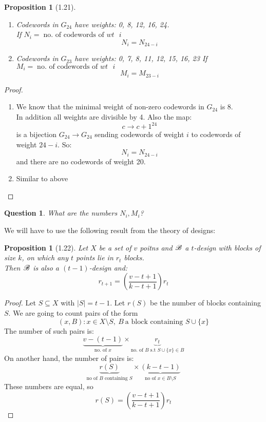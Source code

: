 \documentclass[]{article}
\newtheorem{prop}[thm]{Proposition}
\newtheorem*{quest}{Question}
\theoremstyle{definition}
\theoremstyle{remark}
\numberwithin{equation}{section}
\begin{document}
		\begin{prop}[1.21]\hfill
			\begin{enumerate}
				\item Codewords in $G_{24}$ have weights: 0, 8, 12, 16, 24.\\
					If $N_i = \; \text{no. of codewords of $wt$ $i$}$
					\[
						N_i = N_{24-i}
					\]
				\item Codewords in $G_{23}$ have weights: 0, 7, 8, 11, 12, 15, 16, 23
					If $M_i = \; \text{no. of codewords of $wt$ $i$}$
					\[
						M_i = M_{23-i}
					\]
			\end{enumerate}
		\end{prop}
		\begin{proof}\hfill
			\begin{enumerate}
				\item We know that the minimal weight of non-zero codewords in $G_{24}$ is 8.\\
				In addition all weights are divisible by 4. Also the map:\\
				\[
					c \longrightarrow c + 1^{24}
				\]
				is a bijection $G_{24} \rightarrow G_{24}$ sending codewords of weight $i$ to codewords of weight $24 - i$. So:
				\[
					N_i = N_{24-i}
				\]
				and there are no codewords of weight 20.
				\item Similar to above
			\end{enumerate}
		\end{proof}

		\begin{quest}What are the numbers $N_i, M_i$?\end{quest}

		We will have to use the following result from the theory of designs:
		\begin{prop}[1.22]\hfill
			Let $X$ be a set of $v$ poitns and $\mathscr B$ a $t$-design with blocks of size $k$, on which any $t$ points lie in $r_t$ blocks.\\
			Then $\mathscr B$ is also a $(t-1)$-design and:
			\[
				r_{t+1} = \left(\frac{v-t+1}{k-t+1}\right) r_t
			\]
		\end{prop}
		\begin{proof}Let $S \subseteq X$ with $|S| = t-1$. Let $r(S)$ be the number of blocks containing $S$. We are going to count pairs of the form
		\[
			(x, B) : x\in X\setminus S,\ B\ \text{a block containing $S \cup \{x\}$}
		\]
		The number of such pairs is:
		\[
			\underbrace{v - (t - 1)}_\text{no. of $x$} \times \underbrace{r_t}_\text{no. of $B$ s.t $S \cup \{x\} \in B$}
		\]
		On another hand, the number of pairs is:
		\[
			\underbrace{r(S)}_\text{no of $B$ containing $S$} \times \underbrace{(k - t - 1)}_\text{no of $x \in B \setminus S$}
		\]
		These numbers are equal, so
		\[
			r(S) = \left(\frac{v-t+1}{k-t+1}\right) r_t
		\]
		\end{proof}
\end{document}
